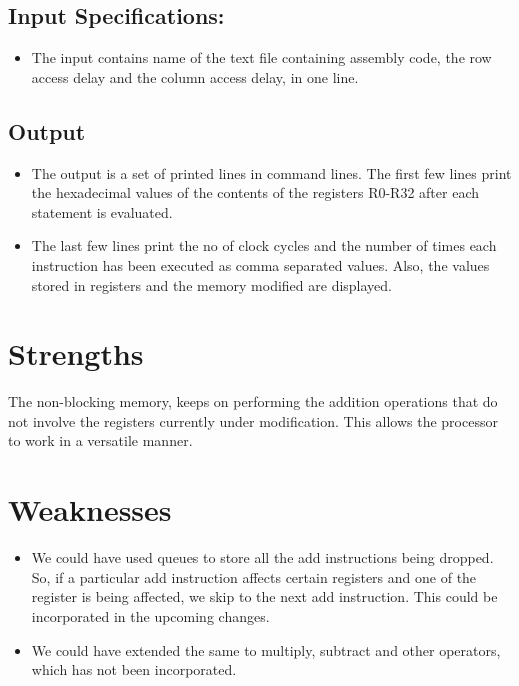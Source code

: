 \documentclass{article} %
\begin{document}
\subsection{Input Specifications:}
\begin{itemize}
    \item The input contains name of the text file containing assembly code, the row access delay and the column access delay, in one line.
\end{itemize}
\subsection{Output}
\begin{itemize}
    \item The output is a set of printed lines in command lines. The first few lines print the hexadecimal values of the contents of the registers R0-R32 after each statement is evaluated.
    \item The last few lines print the no of clock cycles and the number of times each instruction has been executed as comma separated values. Also, the values stored in registers and the memory modified are displayed.
\end{itemize}

\section{Strengths}
The non-blocking memory, keeps on performing the addition operations that do not involve the registers currently under modification. This allows the processor to work in a versatile manner.

\section{Weaknesses}
\begin{itemize}
    \item We could have used queues to store all the add instructions being dropped. So, if a particular add instruction affects certain registers and one of the register is being affected, we skip to the next add instruction. This could be incorporated in the upcoming changes.
    \item We could have extended the same to multiply, subtract and other operators, which has not been incorporated.
\end{itemize}
\end{document}
